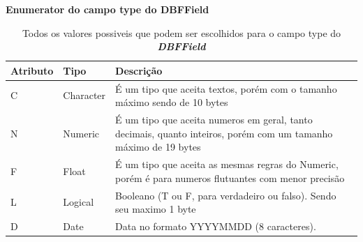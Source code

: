 \begin{table}[H]
    \centering
    \textbf{Enumerator do campo type do DBFField}
    \begin{tabular}{|p{} | p{} | p{}|}
        \hline
        \textbf{Atributo} & \textbf{Tipo} & \textbf{Descrição} \\
        \hline
        C & Character & É um tipo que aceita textos, porém com o tamanho máximo sendo de 10 bytes \\
        \hline
        N & Numeric &  É um tipo que aceita numeros em geral, tanto decimais, quanto inteiros, porém com um tamanho máximo de 19 bytes \\
        \hline
        F & Float  & É um tipo que aceita as mesmas regras do Numeric, porém é para numeros flutuantes com menor precisão \\
        \hline
        L & Logical  & Booleano (T ou F, para verdadeiro ou falso). Sendo seu maximo 1 byte \\
        \hline
        D & Date  & Data no formato YYYYMMDD (8 caracteres). \\
        \hline
    \end{tabular}
    \caption{Todos os valores possiveis que podem ser escolhidos para o campo type do \textit{\textbf{DBFField}}}
    \label{tab:tabela_enumeracao_atributo_type}
\end{table}

